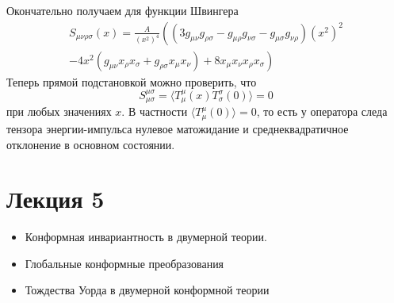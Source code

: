 \documentclass[a4paper,12pt]{article}
\theoremstyle{definition}
\theoremstyle{definition}
\theoremstyle{definition}
\begin{document}
Окончательно получаем для функции Швингера
\begin{multline}
  \label{eq:221}
  S_{\mu\nu\rho\sigma}(x)=\frac{A}{(x^{2})^{4}} \left( (3g_{\mu\nu} g_{\rho\sigma}-g_{\mu\rho}g_{\nu\sigma}-g_{\mu\sigma}g_{\nu\rho}) (x^{2})^{2} 
  \right. \\
  \left.-4 x^{2} (g_{\mu\nu} x_{\rho}x_{\sigma} +g_{\rho\sigma}x_{\mu}x_{\nu}) +8 x_{\mu}x_{\nu}x_{\rho}x_{\sigma}\right)
\end{multline}
Теперь прямой подстановкой можно проверить, что
\begin{equation}
  \label{eq:222}
  S^{\mu\sigma}_{\mu\sigma}=\langle T^{\mu}_{\mu}(x) T^{\sigma}_{\sigma}(0)\rangle=0
\end{equation}
при любых значениях $x$. В частности $\langle T^{\mu}_{\mu}(0)\rangle=0$, то есть у оператора следа
тензора энергии-импульса нулевое матожидание и среднеквадратичное отклонение в основном состоянии. 

\section{Лекция 5}
\label{sec:-5}


  \begin{itemize}
  \item Конформная инвариантность в двумерной теории.
  \item Глобальные конформные преобразования
  \item Тождества Уорда в двумерной конформной теории
  \end{itemize}
\end{document}
